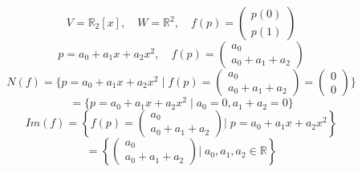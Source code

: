 \documentclass[a4paper]{article}
\theoremstyle{break}
\theoremstyle{break}
\theoremstyle{break}
\theoremstyle{break}
\begin{document}
\begin{example}
  \[
    V = \mathbb{R}_2[x], \quad W = \mathbb{R}^2, \quad f(p) = \begin{pmatrix} p(0)\\p(1) \end{pmatrix}
  \] 
  \[
  p = a_0 + a_1x + a_2x^2, \quad f(p) = \begin{pmatrix} 
    a_0\\
    a_0 + a_1 + a_2
  \end{pmatrix} 
  \] 
  \[
  N(f) = \{p = a_0 + a_1x + a_2x^2 \;|\; f(p) = \begin{pmatrix} a_0\\a_0+a_1+a_2 \end{pmatrix} = \begin{pmatrix} 0\\0 \end{pmatrix}  \} 
  \] 
  \[
  = \{ p = a_0 + a_1x + a_2x^2 \;|\; a_0 = 0, a_1+a_2 = 0\} 
  \] 
  \[
  Im(f) = \left\{f(p) = \begin{pmatrix} 
      a_0\\
      a_0 + a_1 + a_2
  \end{pmatrix} \Big |\; p = a_0 + a_1x + a_2x^2 \right\} 
  \] 
  \[
  = \left\{\begin{pmatrix} a_0\\
  a_0 + a_1 + a_2\end{pmatrix} \Big |\; a_0, a_1, a_2 \in \mathbb{R} \right\} 
  \] 
\end{example}
\end{document}
